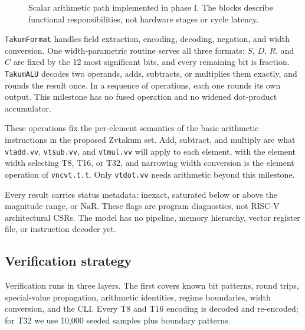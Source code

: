 \documentclass[conference]{IEEEtran}
\newcommand{\NaR}{\mathrm{NaR}}
\newcommand{\code}[1]{\texttt{#1}}
\begin{document}
\begin{figure}[t]
\centering
{}
\caption{Scalar arithmetic path implemented in phase I. The blocks describe
functional responsibilities, not hardware stages or cycle latency.}
\label{fig:architecture}
\end{figure}

\code{TakumFormat} handles field extraction, encoding, decoding, negation, and
width conversion. One width-parametric routine serves all three formats: $S$,
$D$, $R$, and $C$ are fixed by the 12 most significant bits, and every remaining
bit is fraction. \code{TakumALU} decodes two operands, adds, subtracts, or
multiplies them exactly, and rounds the result once. In a sequence of
operations, each one rounds its own output. This milestone has no fused
operation and no widened dot-product accumulator.

These operations fix the per-element semantics of the basic arithmetic
instructions in the proposed Zvtakum set. Add, subtract, and multiply are what
\code{vtadd.vv}, \code{vtsub.vv}, and \code{vtmul.vv} will apply to each
element, with the element width selecting T8, T16, or T32, and narrowing width
conversion is the element operation of \code{vncvt.t.t}. Only \code{vtdot.vv}
needs arithmetic beyond this milestone.

Every result carries status metadata: inexact, saturated below or above the
magnitude range, or $\NaR$. These flags are program diagnostics, not RISC-V
architectural CSRs. The model has no pipeline, memory hierarchy, vector register
file, or instruction decoder yet.

\subsection{Verification strategy}
Verification runs in three layers. The first covers known bit patterns, round
trips, special-value propagation, arithmetic identities, regime boundaries,
width conversion, and the CLI. Every T8 and T16 encoding is decoded and
re-encoded; for T32 we use 10,000 seeded samples plus boundary patterns.
\end{document}
